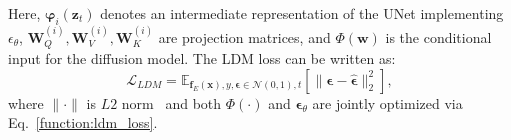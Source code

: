 Here, $\mathbf{\varphi}_i(\mathbf{z}_t)$ denotes an intermediate representation of the UNet implementing $\epsilon_{\theta}$, $\mathbf{W}_Q^{(i)},\mathbf{W}_V^{(i)},\mathbf{W}_K^{(i)}$ are projection matrices, and $\Phi(\mathbf{w})$ is the conditional input for the diffusion model. The LDM loss can be written as:
\begin{equation}
    \mathcal{L}_{LDM}=\mathbb{E}_{\mathbf{f}_E\left(\textbf{x}\right),y,\mathbf{\epsilon} \in \mathcal{N}\left(0,1\right),t}\left[\|\mathbf{\epsilon}-\hat{\mathbf{\epsilon}}\|_2^2\right],
    \label{function:ldm_loss}
\end{equation}
where $\|\cdot\|$ is $L2$ norm~\cite{hinton2015distilling} and both $\Phi(\cdot)$ and $\mathbf{\epsilon}_{\theta}$ are jointly optimized via Eq.~\textcolor{red}{\ref{function:ldm_loss}}.

